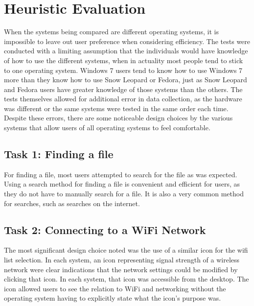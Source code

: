 \documentclass[11pt,letterpaper]{report}
\begin{document}
\chapter{Heuristic Evaluation}
When the systems being compared are different operating systems, it is impossible to leave out user preference when considering efficiency. The tests were conducted with a limiting assumption that the individuals would have knowledge of how to use the different systems, when in actuality most people tend to stick to one operating system. Windows 7 users tend to know how to use Windows 7 more than they know how to use Snow Leopard or Fedora, just as Snow Leopard and Fedora users have greater knowledge of those systems than the others. The tests themselves allowed for additional error in data collection, as the hardware was different or the same systems were tested in the same order each time. Despite these errors, there are some noticeable design choices by the various systems that allow users of all operating systems to feel comfortable.

\section{Task 1: Finding a file}
For finding a file, most users attempted to search for the file as was expected. Using a search method for finding a file is convenient and efficient for users, as they do not have to manually search for a file. It is also a very common method for searches, such as searches on the internet. 

\section{Task 2: Connecting to a WiFi Network}
The most significant design choice noted was the use of a similar icon for the wifi list selection. In each system, an icon representing signal strength of a wireless network were clear indications that the network settings could be modified by clicking that icon. In each system, that icon was accessible from the desktop. The icon allowed users to see the relation to WiFi and networking without the operating system having to explicitly state what the icon's purpose was.
\end{document}
